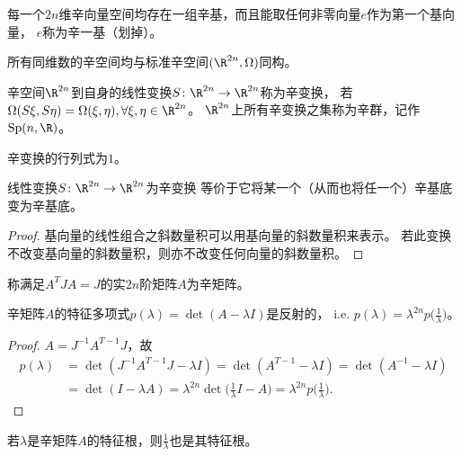 \begin{theorem}
    每一个$2n$维辛向量空间均存在一组辛基，而且能取任何非零向量$e$作为第一个基向量，
    $e$称为辛一基（划掉）。
\end{theorem}

\begin{corollary}
    所有同维数的辛空间均与标准辛空间$(\R^{2n},\Omega)$同构。
\end{corollary}

\begin{definition}
    辛空间$\R^{2n}$到自身的线性变换$S\colon\R^{2n}\to\R^{2n}$称为辛变换，
    若$\Omega(S\xi,S\eta)=\Omega(\xi,\eta),\forall\xi,\eta\in\R^{2n}$。
    $\R^{2n}$上所有辛变换之集称为辛群，记作$\operatorname{Sp}(n,\R)$。
\end{definition}

\begin{theorem}
    辛变换的行列式为$1$。
\end{theorem}

\begin{theorem}
    线性变换$S\colon\R^{2n}\to\R^{2n}$为辛变换
    等价于它将某一个（从而也将任一个）辛基底变为辛基底。
\end{theorem}
\begin{proof}
    基向量的线性组合之斜数量积可以用基向量的斜数量积来表示。
    若此变换不改变基向量的斜数量积，则亦不改变任何向量的斜数量积。
\end{proof}

\begin{definition}[辛矩阵]
    称满足$A^TJA=J$的实$2n$阶矩阵$A$为辛矩阵。
\end{definition}

\begin{theorem}
    辛矩阵$A$的特征多项式$p(\lambda)=\det(A-\lambda I)$是反射的，
    i.e. $p(\lambda)=\lambda^{2n}p\big(\frac{1}{\lambda}\big)$。
\end{theorem}
\begin{proof}
    $A=J^{-1}A^{T-1}J$，故
    \begin{align*}
        p(\lambda)&=\det(J^{-1}A^{T-1}J-\lambda I)
        =\det(A^{T-1}-\lambda I)=\det(A^{-1}-\lambda I)\\
        &=\det(I-\lambda A)
        =\lambda^{2n}\det\big(\tfrac{1}{\lambda}I-A\big)
        =\lambda^{2n}p\big(\tfrac{1}{\lambda}\big).
    \end{align*}
\end{proof}
\begin{corollary}
    若$\lambda$是辛矩阵$A$的特征根，则$\frac{1}{\lambda}$也是其特征根。
\end{corollary}

